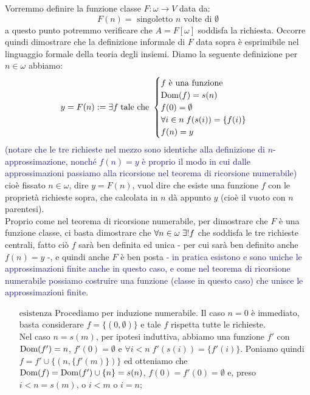 \begin{soln}
	Vorremmo definire la funzione classe $F : \omega \to V$ data da:
	\[ \text{$F(n) =$ singoletto $n$ volte di $\emptyset$}
		\]
	a questo punto potremmo verificare che $A = F[\omega]$ soddisfa la richiesta. Occorre quindi dimostrare che la definizione informale di $F$ data sopra è esprimibile nel linguaggio formale della teoria degli insiemi.
	Diamo la seguente definizione per $n \in \omega$ abbiamo:
	\[ y = F(n) := \exists f \;\text{tale che } \begin{cases}
		\text{$f$ è una funzione} \\
		\operatorname{Dom}(f) = s(n) \\
		f(0) = \emptyset \\
		\forall i \in n \; f(s(i)) = \{f(i)\} \\
		f(n) = y
	\end{cases}
		\]	
	\textcolor{MidnightBlue}{(notare che le tre richieste nel mezzo sono identiche alla definizione di $n$-approssimazione, nonché $f(n) = y$ è proprio il modo in cui dalle approssimazioni passiamo alla ricorsione nel teorema di ricorsione numerabile)}
	cioè fissato $n \in \omega$, dire $y = F(n)$, vuol dire che esiste una funzione $f$ con le proprietà richieste sopra, che calcolata in $n$ dà appunto $y$ (cioè il vuoto con $n$ parentesi).\\
	Proprio come nel teorema di ricorsione numerabile, per dimostrare che $F$ è una funzione classe, ci basta dimostrare che $\forall n \in \omega \; \exists\textcolor{red}!f$ che soddisfa le tre richieste centrali, fatto ciò
	$f$ sarà ben definita ed unica - per cui sarà ben definito anche $f(n) = y$ -, e quindi anche $F$ è ben posta \textcolor{MidnightBlue}{- in pratica esistono e sono uniche le approssimazioni finite anche in questo caso, e come nel teorema di ricorsione numerabile possiamo costruire una funzione (classe in questo caso) che unisce le approssimazioni finite}.
	\begin{itemize}
		\item[$\boxed{\text{esistenza}}$] Procediamo per induzione numerabile. Il caso $n = 0$ è immediato, basta considerare $f = \{(0,\emptyset)\}$ e tale $f$ rispetta tutte le richieste.\\
		Nel caso $n = s(m)$, per ipotesi induttiva, abbiamo una funzione $f'$ con $\operatorname{Dom}(f') = n$, $f'(0) = \emptyset$ e $\forall i < n \; f'(s(i)) = \{f'(i)\}$.
		Poniamo quindi $f = f' \cup \{(n,\{f'(m)\})\}$ ed otteniamo che $\operatorname{Dom}(f) = \operatorname{Dom}(f') \cup \{n\} = s(n)$, $f(0) = f'(0) = \emptyset$ e, preso $i < n = s(m)$, o $i < m$ o $i = n$;

\end{itemize}
\end{soln}
